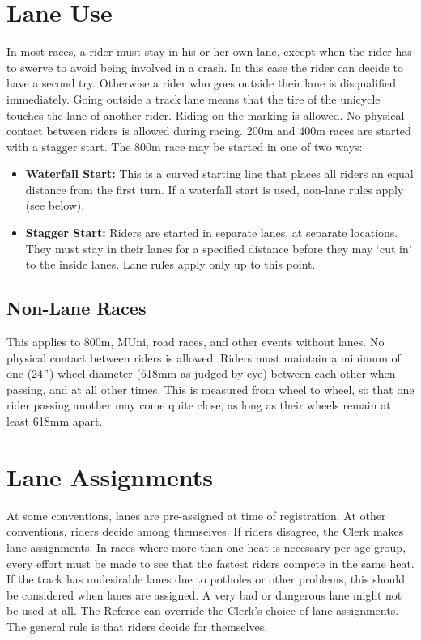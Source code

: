 \section{Lane Use}
In most races, a rider must stay in his or her own lane, except when the rider has to swerve to avoid being involved in a crash.
In this case the rider can decide to have a second try.
Otherwise a rider who goes outside their lane is disqualified immediately.
Going outside a track lane means that the tire of the unicycle touches the lane of another rider.
Riding on the marking is allowed.
No physical contact between riders is allowed during racing.
200m and 400m races are started with a stagger start.
The 800m race may be started in one of two ways:
\begin{itemize}
\item \textbf{Waterfall Start:} This is a curved starting line that places all riders an equal distance from the first turn.
If a waterfall start is used, non-lane rules apply (see below).
\item \textbf{Stagger Start:} Riders are started in separate lanes, at separate locations.
They must stay in their lanes for a specified distance before they may ‘cut in' to the inside lanes.
Lane rules apply only up to this point.
\end{itemize}

\subsection{Non-Lane Races \label{subsec:racing_lane-use_non-lane-races}}
This applies to 800m, MUni, road races, and other events without lanes.
No physical contact between riders is allowed.
Riders must maintain a minimum of one (24$"$) wheel diameter (618mm as judged by eye) between each other when passing, and at all other times.
This is measured from wheel to wheel, so that one rider passing another may come quite close, as long as their wheels remain at least 618mm apart.

\section{Lane Assignments}
At some conventions, lanes are pre-assigned at time of registration.
At other conventions, riders decide among themselves.
If riders disagree, the Clerk makes lane assignments.
In races where more than one heat is necessary per age group, every effort must be made to see that the fastest riders compete in the same heat.
If the track has undesirable lanes due to potholes or other problems, this should be considered when lanes are assigned.
A very bad or dangerous lane might not be used at all.
The Referee can override the Clerk's choice of lane assignments.
The general rule is that riders decide for themselves.

